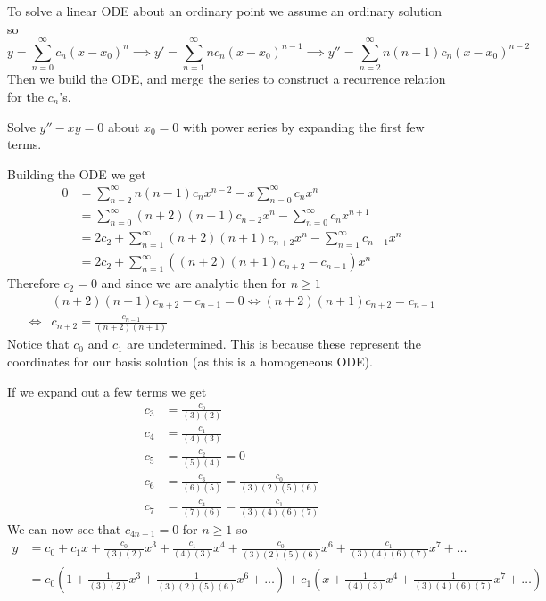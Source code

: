 \documentclass[notes]{subfiles}
\begin{document}
To solve a linear ODE about an ordinary point we assume an ordinary solution so
\[
    y = \sum_{n = 0}^\infty c_n(x - x_0)^n \implies y' = \sum_{n = 1}^\infty nc_n(x - x_0)^{n - 1} \implies y'' = \sum_{n = 2}^\infty n(n - 1)c_n(x - x_0)^{n - 2}
\]
Then we build the ODE, and merge the series to construct a recurrence relation for the $c_n$'s.

\begin{exercise}
    Solve $y'' - xy = 0$ about $x_0 = 0$ with power series by expanding the first few terms.
\end{exercise}
\begin{solution}
    Building the ODE we get 
    \begin{align*}
        0 &= \sum_{n = 2}^\infty n(n - 1)c_nx^{n - 2} - x\sum_{n = 0}^\infty c_nx ^n \\
        &= \sum_{n = 0}^\infty (n + 2)(n + 1)c_{n + 2}x^n - \sum_{n = 0}^\infty c_nx^{n + 1} \\
        &= 2c_2 + \sum_{n = 1}^\infty (n + 2)(n + 1)c_{n + 2}x^n - \sum_{n = 1}^\infty c_{n - 1}x^n \\
        &= 2c_2 + \sum_{n = 1}^\infty ((n + 2)(n + 1)c_{n + 2} - c_{n - 1})x^n
    \end{align*}
    Therefore $c_2 = 0$ and since we are analytic then for $n \geq 1$
    \begin{align*}
        &(n + 2)(n + 1)c_{n + 2} - c_{n - 1} = 0
        \iff (n + 2)(n + 1)c_{n + 2} = c_{n - 1} \\
        \iff& c_{n + 2} = \frac{c_{n - 1}}{(n + 2)(n + 1)}
    \end{align*}
    Notice that $c_0$ and $c_1$ are undetermined. This is because these represent the coordinates for our basis solution (as this is a homogeneous ODE).

    If we expand out a few terms we get
    \begin{align*}
        c_3 &= \frac{c_0}{(3)(2)} \\
        c_4 &= \frac{c_1}{(4)(3)} \\
        c_5 &= \frac{c_2}{(5)(4)} = 0 \\
        c_6 &= \frac{c_3}{(6)(5)} = \frac{c_0}{(3)(2)(5)(6)} \\
        c_7 &= \frac{c_4}{(7)(6)} = \frac{c_1}{(3)(4)(6)(7)}
    \end{align*}
    We can now see that $c_{4n + 1} = 0$ for $n \geq 1$ so
    \begin{align*}
        y
        &= c_0 + c_1x + \frac{c_0}{(3)(2)}x^3 + \frac{c_1}{(4)(3)}x^4 + \frac{c_0}{(3)(2)(5)(6)}x^6 + \frac{c_1}{(3)(4)(6)(7)}x^7 + \ldots \\
        &= c_0\left(1 + \frac{1}{(3)(2)}x^3 + \frac{1}{(3)(2)(5)(6)}x^6 + \ldots \right) + c_1\left(x + \frac{1}{(4)(3)}x^4 + \frac{1}{(3)(4)(6)(7)}x^7 + \ldots \right)
    \end{align*}
\end{solution}
\end{document}
